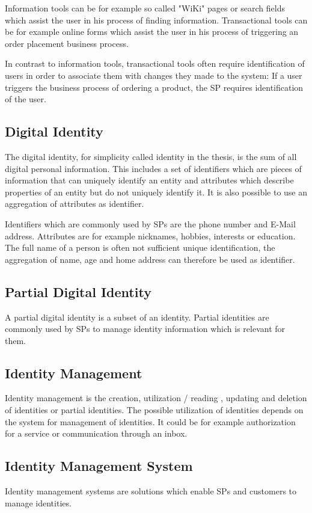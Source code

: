 \documentclass[
     12pt,         %
     a4paper,      %
     BCOR=10mm,version=first,     %
     DIV=14,version=first,        %
     ]{scrreprt}
\begin{document}
Information tools can be for example so called "WiKi" pages or search fields which assist the user in his process of finding information. Transactional tools can be for example online forms which assist the user in his process of triggering an order placement business process.

In contrast to information tools, transactional tools often require identification of users in order to associate them with changes they made to the system: If a user triggers the business process of ordering a product, the SP requires identification of the user.

\subsection{Digital Identity}
The digital identity, for simplicity called identity in the thesis, is the sum of all digital personal information. This includes a set of identifiers which are pieces of information that can uniquely identify an entity and attributes which describe properties of an entity but do not uniquely identify it. It is also possible to use an aggregation of attributes as identifier.

Identifiers which are commonly used by SPs are the phone number and E-Mail address. Attributes are for example nicknames, hobbies, interests or education. The full name of a person is often not sufficient unique identification, the aggregation of name, age and home address can therefore be used as identifier.

\subsection{Partial Digital Identity}
A partial digital identity is a subset of an identity. Partial identities are commonly used by SPs to manage identity information which is relevant for them. 

\subsection{Identity Management}
Identity management is the creation, utilization / reading , updating and deletion of identities or partial identities. The possible utilization of identities depends on the system for management of identities. It could be for example authorization for a service or communication through an inbox.

\subsection{Identity Management System}
Identity management systems are solutions which enable SPs and customers to manage identities.
\end{document}
